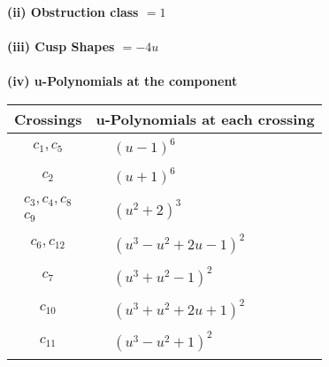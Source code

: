 \documentclass[1p]{elsarticle_modified}
\theoremstyle{definition}
\begin{document}
\flushleft \textbf{(ii) Obstruction class $= 1$}\\~\\
\flushleft \textbf{(iii) Cusp Shapes $= -4 u$}\\~\\
\newpage\renewcommand{\arraystretch}{1}
\flushleft \textbf{(iv) u-Polynomials at the component}\newline \\
\begin{tabular}{m{50pt}|m{274pt}}
Crossings & \hspace{64pt}u-Polynomials at each crossing \\
\hline $$\begin{aligned}c_{1},c_{5}\end{aligned}$$&$\begin{aligned}
&(u-1)^6
\end{aligned}$\\
\hline $$\begin{aligned}c_{2}\end{aligned}$$&$\begin{aligned}
&(u+1)^6
\end{aligned}$\\
\hline $$\begin{aligned}c_{3},c_{4},c_{8}\\c_{9}\end{aligned}$$&$\begin{aligned}
&(u^2+2)^3
\end{aligned}$\\
\hline $$\begin{aligned}c_{6},c_{12}\end{aligned}$$&$\begin{aligned}
&(u^3- u^2+2 u-1)^2
\end{aligned}$\\
\hline $$\begin{aligned}c_{7}\end{aligned}$$&$\begin{aligned}
&(u^3+u^2-1)^2
\end{aligned}$\\
\hline $$\begin{aligned}c_{10}\end{aligned}$$&$\begin{aligned}
&(u^3+u^2+2 u+1)^2
\end{aligned}$\\
\hline $$\begin{aligned}c_{11}\end{aligned}$$&$\begin{aligned}
&(u^3- u^2+1)^2
\end{aligned}$\\
\hline
\end{tabular}\\~\\
\end{document}
